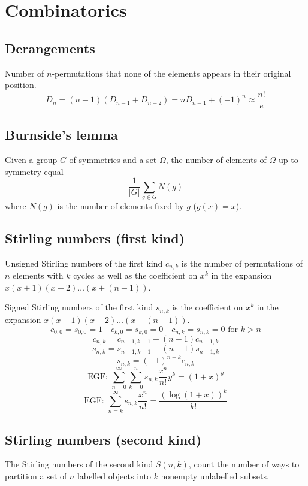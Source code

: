 \chapter{Combinatorics}

\section{Derangements}
Number of $n$-permutations that none of the elements appears in their original position.
$$D_n = (n - 1)(D_{n - 1} + D_{n - 2}) = nD_{n - 1} + (-1)^n \approx \frac{n!}{e}$$




\section{Burnside's lemma}
Given a group $G$ of symmetries and a set $\Omega$, the number of elements of $\Omega$ up to symmetry equal
$$\frac{1}{|G|} \sum_{g \in G} N(g)$$
where $N(g)$ is the number of elements fixed by $g$ ($g(x) = x$).





\section{Stirling numbers (first kind)}
Unsigned Stirling numbers of the first kind $c_{n, k}$ is the number of permutations of $n$ elements with $k$ cycles as well as the coefficient on $x^k$ in the expansion $x(x + 1)(x + 2)\dots(x + (n - 1))$.


Signed Stirling numbers of the first kind $s_{n, k}$ is the coefficient on $x^k$ in the expansion $x(x - 1)(x - 2)\dots(x - (n - 1))$.
$$c_{0, 0} = s_{0, 0} = 1 \quad c_{k, 0} = s_{k, 0} = 0 \quad c_{n, k} = s_{n, k} = 0 \text{ for } k > n$$
$$c_{n, k} = c_{n - 1, k - 1} + (n - 1)c_{n - 1, k}$$
$$s_{n, k} = s_{n - 1, k - 1} - (n - 1)s_{n - 1, k}$$
$$s_{n, k} = (-1)^{n + k}c_{n, k}$$
$$\text{EGF: } \sum_{n = 0}^{\infty}\sum_{k = 0}^{n}s_{n, k}\frac{x^n}{n!}y^k = (1 + x)^y$$
$$\text{EGF: } \sum_{n = k}^{\infty}s_{n, k}\frac{x^n}{n!} = \frac{(\log(1 + x))^k}{k!}$$




\section{Stirling numbers (second kind)}
The Stirling numbers of the second kind $S(n, k)$, count the number of ways to partition a set of $n$ labelled objects into $k$ nonempty unlabelled subsets.

